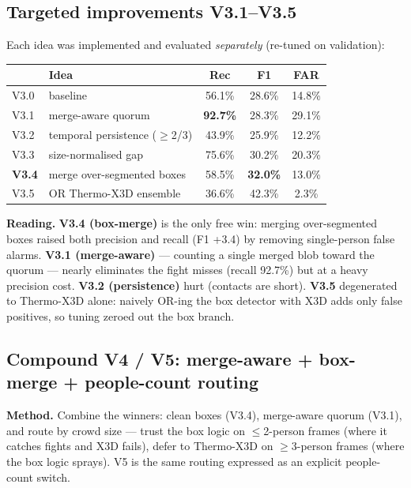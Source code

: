 \documentclass[11pt, a4paper]{article}
\begin{document}
\subsection{Targeted improvements V3.1--V3.5}
\label{sec:v3x}
Each idea was implemented and evaluated \emph{separately} (re-tuned on validation):

\begin{center}\renewcommand{\arraystretch}{1.15}
\begin{tabular}{l l c c c}
\toprule
& \textbf{Idea} & \textbf{Rec} & \textbf{F1} & \textbf{FAR} \\
\midrule
V3.0 & baseline                         & 56.1\% & 28.6\% & 14.8\% \\
V3.1 & merge-aware quorum               & \textbf{92.7\%} & 28.3\% & 29.1\% \\
V3.2 & temporal persistence ($\ge$2/3)  & 43.9\% & 25.9\% & 12.2\% \\
V3.3 & size-normalised gap              & 75.6\% & 30.2\% & 20.3\% \\
\textbf{V3.4} & merge over-segmented boxes & 58.5\% & \textbf{32.0\%} & 13.0\% \\
V3.5 & OR Thermo-X3D ensemble           & 36.6\% & 42.3\% & 2.3\% \\
\bottomrule
\end{tabular}\end{center}

\textbf{Reading.} \textbf{V3.4 (box-merge)} is the only free win: merging
over-segmented boxes raised both precision and recall (F1 +3.4) by removing
single-person false alarms. \textbf{V3.1 (merge-aware)} --- counting a single
merged blob toward the quorum --- nearly eliminates the fight misses (recall
92.7\%) but at a heavy precision cost. \textbf{V3.2 (persistence)} hurt (contacts
are short). \textbf{V3.5} degenerated to Thermo-X3D alone: naively OR-ing the box
detector with X3D adds only false positives, so tuning zeroed out the box branch.

\subsection{Compound V4 / V5: merge-aware + box-merge + people-count routing}
\label{sec:v4}
\textbf{Method.} Combine the winners: clean boxes (V3.4), merge-aware quorum
(V3.1), and route by crowd size --- trust the box logic on $\le$2-person frames
(where it catches fights and X3D fails), defer to Thermo-X3D on $\ge$3-person
frames (where the box logic sprays). V5 is the same routing expressed as an
explicit people-count switch.
\end{document}
